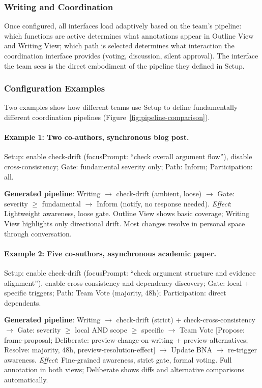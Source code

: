 \subsubsection{Writing and Coordination}

Once configured, all interfaces load adaptively based on the team's pipeline: which functions are active determines what annotations appear in Outline View and Writing View; which path is selected determines what interaction the coordination interface provides (voting, discussion, silent approval). The interface the team sees is the direct embodiment of the pipeline they defined in Setup.


\subsubsection{Configuration Examples}
\label{sec:config-examples}

Two examples show how different teams use Setup to define fundamentally different coordination pipelines (Figure~\ref{fig:pipeline-comparison}).

\paragraph{Example 1: Two co-authors, synchronous blog post.} Setup: enable check-drift (focusPrompt: ``check overall argument flow''), disable cross-consistency; Gate: fundamental severity only; Path: Inform; Participation: all.

\noindent \textbf{Generated pipeline}: Writing $\rightarrow$ check-drift (ambient, loose) $\rightarrow$ Gate: severity $\geq$ fundamental $\rightarrow$ Inform (notify, no response needed). \emph{Effect}: Lightweight awareness, loose gate. Outline View shows basic coverage; Writing View highlights only directional drift. Most changes resolve in personal space through conversation.

\paragraph{Example 2: Five co-authors, asynchronous academic paper.} Setup: enable check-drift (focusPrompt: ``check argument structure and evidence alignment''), enable cross-consistency and dependency discovery; Gate: local + specific triggers; Path: Team Vote (majority, 48h); Participation: direct dependents.

\noindent \textbf{Generated pipeline}: Writing $\rightarrow$ check-drift (strict) + check-cross-consistency $\rightarrow$ Gate: severity $\geq$ local AND scope $\geq$ specific $\rightarrow$ Team Vote [Propose: frame-proposal; Deliberate: preview-change-on-writing + preview-alternatives; Resolve: majority, 48h, preview-resolution-effect] $\rightarrow$ Update BNA $\rightarrow$ re-trigger awareness. \emph{Effect}: Fine-grained awareness, strict gate, formal voting. Full annotation in both views; Deliberate shows diffs and alternative comparisons automatically.

